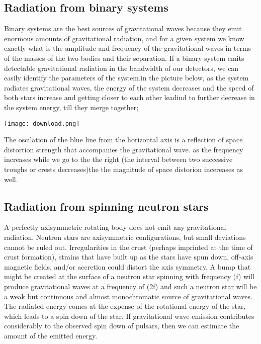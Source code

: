 \documentclass[11]{article}
\begin{document}
\subsection{Radiation from binary systems}
Binary systems are the best sources of gravitational waves because they emit enormous amounts of gravitational radiation, and for a given system we know exactly what is the amplitude and frequency of the gravitational waves in terms of the masses of the two bodies and their separation. If a binary system emits detectable gravitational radiation in the bandwidth of our detectors, we can easily identify the parameters of the system.in the picture below, as the system radiates gravitational waves, the energy of the system decreases and the speed of both stars increase and getting closer to each other leadind to further decrease in the system energy, till they merge together; 
\begin{center}
\texttt{[image: download.png]}
\end{center}

The oscilation of the blue line from the horizontal axis is a reflection of space distortion strength that accompanies the gravitational wave. as the frequency increases while we go to the the right (the interval between two successive troughs or crests decreases)the the magnitude of space distorion incereases as well.

\subsection{Radiation from spinning neutron stars}

A perfectly axisymmetric rotating body does not emit any gravitational radiation.
Neutron stars are axisymmetric configurations, but small deviations cannot be ruled
out. Irregularities in the crust (perhaps imprinted at the time of crust formation),
strains that have built up as the stars have spun down, off-axis magnetic fields,
and/or accretion could distort the axis symmetry. A bump that might be created at
the surface of a neutron star spinning with frequency (f) will produce gravitational
waves at a frequency of (2f) and such a neutron star will be a weak but continuous and almost monochromatic source of gravitational waves. The radiated energy comes at the expense of the rotational energy of the star, which leads to a spin down of the star. If gravitational wave emission contributes considerably to the observed spin down of pulsars, then we can estimate the amount of the emitted energy.
\end{document}
